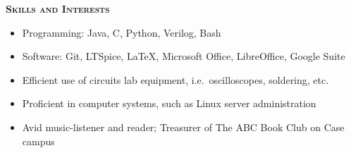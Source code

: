 \documentclass[12pt]{article}
\newcommand*{\titlefont}{\fontfamily{pnc}\selectfont}
\begin{document}
\bigbreak{}

{\titlefont\large\textsc{\textbf{Skills and Interests}}}
\hrulefill{}\\
%
\vspace{-\topsep}
\begin{itemize}
    \setlength{\parskip}{0pt}
    \setlength{\itemsep}{0pt plus 1 pt}
    \item Programming: Java, C, Python, Verilog, Bash
    \item Software: Git, LTSpice, LaTeX, Microsoft Office, LibreOffice, Google Suite
    \item Efficient use of circuits lab equipment, i.e.\ oscilloscopes, soldering, etc.
    \item Proficient in computer systems, such as Linux server administration
    \item Avid music-listener and reader; Treasurer of The ABC Book Club on Case campus

\end{itemize}
\end{document}
